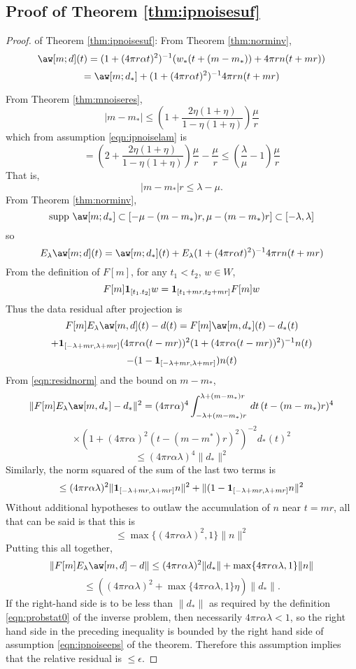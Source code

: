 
\subsection{Proof of Theorem \ref{thm:ipnoisesuf}}
\begin{proof} of Theorem \ref{thm:ipnoisesuf}:
From Theorem \ref{thm:norminv}, 
\[
  \aw[m;d](t) = (1+ (4 \pi r \alpha t)^2)^{-1}(w_*(t+(m-m_*)) + 4\pi r 
  n(t+mr)) 
\]
\[
  = \aw[m;d_*] + (1+ (4 \pi r \alpha t)^2)^{-1}4\pi r n(t+mr)
\]

From Theorem \ref{thm:mnoiseres},
\[
  |m-m_*| \le \left(1+\frac{2\eta(1+\eta)}{1-\eta(1+\eta)}\right)\frac{\mu}{r} 
\]
which from assumption \ref{eqn:ipnoiselam} is
\[
  =\left(2+\frac{2\eta(1+\eta)}{1-\eta(1+\eta)}\right)\frac{\mu}{r}
  -\frac{\mu}{r} \le \left(\frac{\lambda}{\mu}-1\right)\frac{\mu}{r}
\]
That is,
\[
  |m-m_*|r \le \lambda-\mu.
\]
From Theorem \ref{thm:norminv},
\[
  \mbox{supp }\aw[m;d_*] \subset [-\mu-(m-m_*)r, \mu-(m-m_*)r]
  \subset [-\lambda,\lambda]
\]
so
\[
  E_{\lambda}\aw[m;d](t) = \aw[m;d_*](t) + E_{\lambda}(1+ (4 \pi r \alpha
  t)^2)^{-1}4\pi r n(t+mr)
\]
From the definition of $F[m]$, for any $t_1<t_2$, $w \in W$,  
\[
  F[m]{\bf 1}_{[t_1.t_2]}w = {\bf 1}_{[t_1+mr,t_2+mr]}F[m]w  
\]
Thus the data residual after projection is
\[
  F[m]E_{\lambda}\aw[m,d](t) -d(t) = F[m]\aw[m,d_*](t) -d_*(t)  
\]
\[
  + {\bf 1}_{[-\lambda+mr,\lambda+mr]}(4 \pi r \alpha (t-mr))^2 (1+ (4 \pi
  r \alpha (t-mr))^2)^{-1} n(t)
\]
\[
  -(1- {\bf 1}_{[-\lambda+mr,\lambda+mr]})n(t)
\]
From \ref{eqn:residnorm} and the bound on $m-m_*$,
\[
  \| F[m]E_{\lambda}\aw[m,d_*] -d_*\|^2 = (4 \pi r \alpha)^4
  \int_{-\lambda+(m-m_*)r}^{\lambda+(m-m_*)r}\,dt\, (t-(m-m_*)r)^4
\]
\[
  \times (1+(4\pi r \alpha)^2 
  (t-(m-m^*)r)^2)^{-2}d_*(t)^2
\]
\[
  \le (4 \pi r \alpha \lambda)^4\|d_*\|^2
\]
Similarly, the norm squared of the sum of the last two terms is 
\[
  \le (4 \pi r \alpha \lambda)^2 \|{\bf 1}_{[-\lambda+mr,\lambda+mr]}
  n\|^2 + \|(1 - {\bf 1}_{[-\lambda+mr,\lambda+mr]}n\|^2
\]
Without additional hypotheses to outlaw the accumulation of $n$ near
$t=mr$, all that can be said is that this is
\[
  \le \max \{(4 \pi r \alpha \lambda)^2, 1\} \|n\|^2
\]
Putting this all together,
\[
  \|F[m]E_{\lambda}\aw[m,d]-d\| \le (4 \pi r \alpha
  \lambda)^2\|d_*\| + \max \{4\pi r \alpha \lambda, 1\}\|n\|
\]
\[
  \le ((4 \pi r \alpha \lambda)^2 +\max \{4\pi r \alpha \lambda, 1\}
  \eta)\|d_*\|.
\]
If the right-hand side is to be less than $\|d_*\|$ as required by the
definition \ref{eqn:probstat0} of the inverse problem, then
necessarily $4\pi r\alpha \lambda < 1$, so the right hand side in the
preceding inequality is bounded by the right hand side of assumption
\ref{eqn:ipnoiseeps} of the theorem. Therefore this assumption implies
that the relative residual is $\le \epsilon$.
\end{proof}

